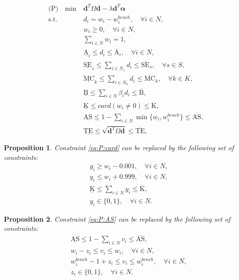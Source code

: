 \documentclass[12pt]{article}
\newtheorem{pro}{Proposition}
\begin{document}
	\begin{align}
	\text{(P)} \quad \min~ & \bm{d}^T \Omega \bm{d} - \lambda \bm{d}^T \bm{\alpha} \label{eq:P:obj}\\
	\text{s.t. } 
	& d_i = w_i - w_i^{bench}, \quad \forall i \in N, \label{eq:P:aw}\\
	& w_i \ge 0, \quad \forall i \in N, \label{eq:P:nonn}\\
	& \sum_{i \in N} w_i = 1, \label{eq:P:sum}\\
	& \underline{\text{A}}_i \le d_i \le \overline{\text{A}}_i, \quad \forall i \in N, \label{eq:P:d}\\
	& \underline{\text{SE}}_s \le \sum_{i \in N_s} d_i \le \overline{\text{SE}}_s, \quad \forall s \in S, \label{eq:P:sector}\\
	& \underline{\text{MC}}_k \le \sum_{i \in N_k} d_i \le \overline{\text{MC}}_k, \quad \forall k \in K, \label{eq:P:MCAPQ}\\
	& \underline{\text{B}} \le \sum_{i \in N} \beta_i d_i \le \overline{\text{B}}, \label{eq:P:beta}\\
	& \underline{\text{K}} \le card(w_i \neq 0) \le \overline{\text{K}}, \label{eq:P:card}\\
	& \underline{\text{AS}} \le 1 - \sum_{i \in N} \min\{w_i, w^{bench}_i \} \le \overline{\text{AS}}, \label{eq:P:AS}\\
	& \underline{\text{TE}} \le \sqrt{\bm{d}^T \Omega \bm{d}} \le \overline{\text{TE}}, \label{eq:P:TE}
	\end{align}
	
	\begin{pro} \label{pro:AS}
		Constraint \eqref{eq:P:card} can be replaced by the following set of constraints:
		\begin{align*}
		&y_i \ge w_i - 0.001, \quad \forall i \in N, \\
		&y_i \le w_i + 0.999, \quad \forall i \in N,\\
		&\underline{\text{K}} \le \sum_{i \in N} y_i \le \overline{\text{K}}, \\
		&y_i \in \{0,1\}, \quad \forall i \in N.
		\end{align*}
	\end{pro}

\begin{pro}\label{pro:TE}
	Constraint \eqref{eq:P:AS} can be replaced by the following set of constraints:
	\begin{align*}
	& \underline{\text{AS}} \le 1 -  \sum_{i \in N} v_i \le \overline{\text{AS}},\\
	& w_i - z_i \le v_i \le w_i, \quad \forall i \in N,\\
	& w^{bench}_i - 1 + z_i \le v_i \le w^{bench}_i, \quad \forall i \in N,\\
	& z_i \in \{0,1\}, \quad \forall i \in N.
	\end{align*}
\end{pro}
\end{document}

